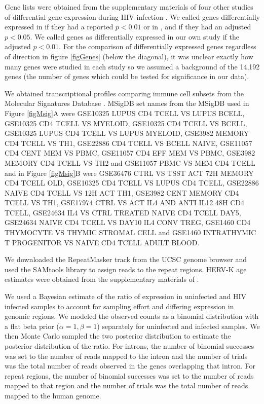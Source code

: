 \documentclass[../sherrill-Mix_thesis.tex]{subfiles}
\begin{document}
		Gene lists were obtained from the supplementary materials of four other studies of differential gene expression during HIV infection \citep{Li2009,Imbeault2012,Lefebvre2011,Chang2011}. We called genes differentially expressed in \citet{Li2009} if they had a reported $p<0.01$ or in \citet{Lefebvre2011}, \citet{Chang2011} and \citet{Imbeault2012} if they had an adjusted $p<0.05$. We called genes as differentially expressed in our own study if the adjusted $p<0.01$. For the comparison of differentially expressed genes regardless of direction in figure \ref{figGenes} (below the diagonal), it was unclear exactly how many genes were studied in each study so we assumed a background of the 14,192 genes (the number of genes which could be tested for significance in our data). 
		
		We obtained transcriptional profiles comparing immune cell subsets from the Molecular Signatures Database \citep{Subramanian2005}. MSigDB set names from the MSigDB used in Figure \ref{figMsig}A were GSE10325 LUPUS CD4 TCELL VS LUPUS BCELL, GSE10325 CD4 TCELL VS MYELOID, GSE10325 CD4 TCELL VS BCELL, GSE10325 LUPUS CD4 TCELL VS LUPUS MYELOID, GSE3982 MEMORY CD4 TCELL VS TH1, GSE22886 CD4 TCELL VS BCELL NAIVE, GSE11057 CD4 CENT MEM VS PBMC, GSE11057 CD4 EFF MEM VS PBMC, GSE3982 MEMORY CD4 TCELL VS TH2 and GSE11057 PBMC VS MEM CD4 TCELL and in Figure \ref{figMsig}B were GSE36476 CTRL VS TSST ACT 72H MEMORY CD4 TCELL OLD, GSE10325 CD4 TCELL VS LUPUS CD4 TCELL, GSE22886 NAIVE CD4 TCELL VS 12H ACT TH1, GSE3982 CENT MEMORY CD4 TCELL VS TH1, GSE17974 CTRL VS ACT IL4 AND ANTI IL12 48H CD4 TCELL, GSE24634 IL4 VS CTRL TREATED NAIVE CD4 TCELL DAY5, GSE24634 NAIVE CD4 TCELL VS DAY10 IL4 CONV TREG, GSE1460 CD4 THYMOCYTE VS THYMIC STROMAL CELL and GSE1460 INTRATHYMIC T PROGENITOR VS NAIVE CD4 TCELL ADULT BLOOD. 
		
		We downloaded the RepeatMasker track from the UCSC genome browser \citep{Kent2002a} and used the SAMtools library \citep{Li2009a} to assign reads to the repeat regions. HERV-K age estimates were obtained from the supplementary materials of \citet{Subramanian2011}.

		 We used a Bayesian estimate of the ratio of expression in uninfected and HIV infected samples to account for sampling effort and differing expression in genomic regions. We modeled the observed counts as a binomial distribution with a flat beta prior ($\alpha=1,\beta=1$) separately for uninfected and infected samples. We then Monte Carlo sampled the two posterior distribution to estimate the posterior distribution of the ratio. For introns, the number of binomial successes was set to the number of reads mapped to the intron and the number of trials was the total number of reads observed in the genes overlapping that intron. For repeat regions, the number of binomial successes was set to the number of reads mapped to that region and the number of trials was the total number of reads mapped to the human genome.
\end{document}
